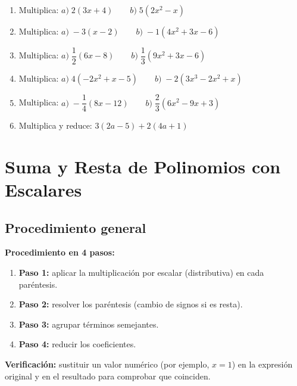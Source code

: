 \documentclass[12pt, letterpaper]{article}
\begin{document}
\begin{enumerate}[leftmargin=*, resume]
  \item \facil{} Multiplica: $a) \; 2(3x + 4) \qquad b) \; 5(2x^2 - x)$

  \item \facil{} Multiplica: $a) \; -3(x - 2) \qquad b) \; -1(4x^2 + 3x - 6)$

  \item \facil{} Multiplica: $a) \; \dfrac{1}{2}(6x - 8) \qquad b) \; \dfrac{1}{3}(9x^2 + 3x - 6)$

  \item \medio{} Multiplica: $a) \; 4(-2x^2 + x - 5) \qquad b) \; -2(3x^3 - 2x^2 + x)$

  \item \medio{} Multiplica: $a) \; -\dfrac{1}{4}(8x - 12) \qquad b) \; \dfrac{2}{3}(6x^2 - 9x + 3)$

  \item \medio{} Multiplica y reduce: $3(2a - 5) + 2(4a + 1)$
\end{enumerate}

\section{Suma y Resta de Polinomios con Escalares}

\subsection{Procedimiento general}

\begin{cuadropasos}
  \textbf{Procedimiento en 4 pasos:}
  \begin{enumerate}[leftmargin=*]
    \item \textbf{Paso 1:} aplicar la multiplicación por escalar (distributiva) en cada paréntesis.
    \item \textbf{Paso 2:} resolver los paréntesis (cambio de signos si es resta).
    \item \textbf{Paso 3:} agrupar términos semejantes.
    \item \textbf{Paso 4:} reducir los coeficientes.
  \end{enumerate}

  \textbf{Verificación:} sustituir un valor numérico (por ejemplo, $x = 1$) en la expresión original y en el resultado para comprobar que coinciden.
\end{cuadropasos}
\end{document}

